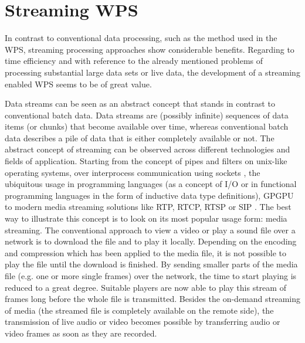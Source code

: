 
\chapter{Streaming WPS}

In contrast to conventional data processing, such as the method used in the \ac{WPS}, streaming processing approaches show considerable benefits. Regarding to time efficiency and with reference to the already mentioned problems of processing substantial large data sets or live data, the development of a streaming enabled \ac{WPS} seems to be of great value.

Data streams can be seen as an abstract concept that stands in contrast to conventional batch data. Data streams are (possibly infinite) sequences of data items (or chunks) that become available over time, whereas conventional batch data describes a pile of data that is either completely available or not. The abstract concept of streaming can be observed across different technologies and fields of application. Starting from the concept of pipes and filters on unix-like operating systems, over interprocess communication using sockets \citep[either local or over a network,][]{buschmann1996pattern}, the ubiquitous usage in programming languages (as a concept of I/O or in functional programming languages in the form of inductive data type definitions), \ac{GPGPU} to modern media streaming solutions like RTP, RTCP, RTSP \citep{ietf:rfc3550,ietf:rfc2326} or SIP \citep{ietf:rfc3261}. The best way to illustrate this concept is to look on its most popular usage form: media streaming. The conventional approach to view a video or play a sound file over a network is to download the file and to play it locally. Depending on the encoding and compression which has been applied to the media file, it is not possible to play the file until the download is finished. By sending smaller parts of the media file (e.g. one or more single frames) over the network, the time to start playing is reduced to a great degree. Suitable players are now able to play this stream of frames long before the whole file is transmitted. Besides the on-demand streaming of media (the streamed file is completely available on the remote side), the transmission of live audio or video becomes possible by transferring audio or video frames as soon as they are recorded.

